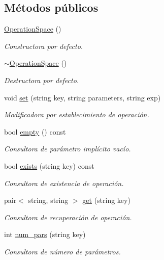 \subsection*{Métodos públicos}
\begin{DoxyCompactItemize}
\item 
\hyperlink{class_operation_space_a7e3b8f0bede707cc77038ace8152d00f}{Operation\+Space} ()
\begin{DoxyCompactList}\small\item\em Constructora por defecto. \end{DoxyCompactList}\item 
\hyperlink{class_operation_space_a5312b628b76702ca0fb82eb925b9999d}{$\sim$\+Operation\+Space} ()
\begin{DoxyCompactList}\small\item\em Destructora por defecto. \end{DoxyCompactList}\item 
void \hyperlink{class_operation_space_af0370646ebfa97001ea7b21fcac4b3b2}{set} (string key, string parameters, string exp)
\begin{DoxyCompactList}\small\item\em Modificadora por establecimiento de operación. \end{DoxyCompactList}\item 
bool \hyperlink{class_operation_space_abdb93147a79f23d909c896a339371e00}{empty} () const 
\begin{DoxyCompactList}\small\item\em Consultora de parámetro implícito vacío. \end{DoxyCompactList}\item 
bool \hyperlink{class_operation_space_a860a20e7ef047fe60690deb1c155e68a}{exists} (string key) const 
\begin{DoxyCompactList}\small\item\em Consultora de existencia de operación. \end{DoxyCompactList}\item 
pair$<$ string, string $>$ \hyperlink{class_operation_space_a82fcdb18f2f2ff9ddb4c2a68cba35116}{get} (string key)
\begin{DoxyCompactList}\small\item\em Consultora de recuperación de operación. \end{DoxyCompactList}\item 
int \hyperlink{class_operation_space_a21c12c42dc3204e985a5bbe53ef17c4b}{num\+\_\+pars} (string key)
\begin{DoxyCompactList}\small\item\em Consultora de número de parámetros. \end{DoxyCompactList}\item 

\end{DoxyCompactItemize}
